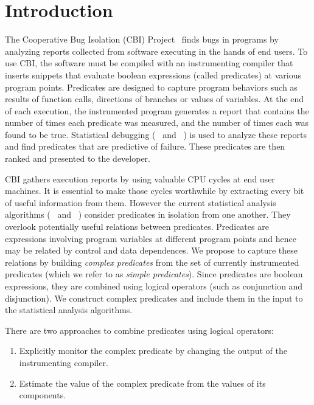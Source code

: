 
\section{Introduction}

The Cooperative Bug Isolation (CBI) Project~\cite{Liblit:2004:CBI} finds bugs in programs by analyzing reports collected from software executing in the hands of end users.  To use CBI, the software must be compiled with an instrumenting compiler that inserts snippets that evaluate boolean expressions (called predicates) at various program points.  Predicates are designed to capture program behaviors such as results of function calls, directions of branches or values of variables.  At the end of each execution, the instrumented program generates a report that contains the number of times each predicate was measured, and the number of times each was found to be true.  Statistical debugging (~\cite{Liblit:2005:SSBI} and ~\cite{Zheng:2006:SDSIMB}) is used to analyze these reports and find predicates that are predictive of failure.  These predicates are then ranked and presented to the developer.

CBI gathers execution reports by using valuable CPU cycles at end user machines.  It is essential to make those cycles worthwhile by extracting every bit of useful information from them.  However the current statistical analysis algorithms (~\cite{Liblit:2005:SSBI} and ~\cite{Zheng:2006:SDSIMB}) consider predicates in isolation from one another.  They overlook potentially useful relations between predicates.  Predicates are expressions involving program variables at different program points and hence may be related by control and data dependences.  We propose to capture these relations by building \emph{complex predicates} from the set of currently instrumented predicates (which we refer to as \emph{simple predicates}).  Since predicates are boolean expressions, they are combined using logical operators (such as conjunction and disjunction).  We construct complex predicates and include them in the input to the statistical analysis algorithms.

There are two approaches to combine predicates using logical operators:
\begin{enumerate}
\item Explicitly monitor the complex predicate by changing the output of the instrumenting compiler.
\item Estimate the value of the complex predicate from the values of its components.
\end{enumerate}

